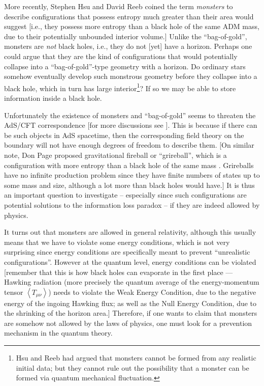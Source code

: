 \documentclass[12pt]{article}
\newcommand{\2}{$^2$}
\newcommand{\3}{$^3$}
\newcommand{\4}{$_4$}
\newcommand{\5}{$_5$}
\begin{document}
More recently, Stephen Hsu and David Reeb \cite{hsu1, hsu2} coined the term \emph{monsters} to describe configurations that possess entropy much greater than their area would suggest [i.e., they possess more entropy than a black hole of the same ADM mass, due to their potentially unbounded interior volume.] Unlike the ``bag-of-gold'', monsters are \emph{not} black holes, i.e., they do not [yet] have a horizon. Perhaps one could argue that they are the kind of configurations that would potentially collapse into a ``bag-of-gold''-type geometry with a horizon. Do ordinary stars somehow eventually develop such monstrous geometry before they collapse into a black hole, which in turn has large interior\footnote{Hsu and Reeb had argued that monsters cannot be formed from any realistic initial data; but they cannot rule out the possibility that a monster can be formed via quantum mechanical fluctuation.}? If so we may be able to store information inside a black hole.

Unfortunately the existence of monsters and ``bag-of-gold'' seems to threaten the AdS/CFT correspondence [for more discussions see \cite{marolf}]. This is because if there can be such objects in AdS spacetime, then the corresponding field theory on the boundary will not have enough degrees of freedom to describe them. [On similar note, Don Page proposed gravitational fireball or ``grireball'', which is a configuration with more entropy than a black hole of the same mass \cite{grireball}. {\color{black}Grireballs have no infinite production problem since they have finite numbers of states up to some mass and size, although a lot more than black holes would have.}] It is thus an important question to investigate -- especially since such configurations are potential solutions to the information loss paradox  -- if they are indeed allowed by physics. 

It turns out that monsters are allowed in general relativity, although this usually means that we have to violate some energy conditions, which is not very surprising since energy conditions are specifically meant to prevent ``unrealistic configurations''. However at the quantum level, energy conditions can be violated [remember that this is how black holes can evaporate in the first place --- Hawking radiation (more precisely the quantum average of the energy-momentum tensor $\left\langle T_{\mu\nu}\right\rangle$) needs to violate the Weak Energy Condition, due to the negative energy of the ingoing Hawking flux; as well as the Null Energy Condition, due to the shrinking of the horizon area.] Therefore, if one wants to claim that monsters are somehow not allowed by the laws of physics, one must look for a prevention mechanism in the quantum theory.
\end{document}

